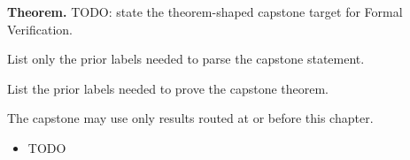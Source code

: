 \label{cap:formal-verification}

\begin{tcolorbox}[
  colback=gray!6,
  colframe=gray!40,
  arc=2pt,
  left=8pt, right=8pt, top=6pt, bottom=6pt,
  title={\small\textbf{Capstone Theorem}},
  fonttitle=\small\bfseries
]
\textbf{Theorem.}
TODO: state the theorem-shaped capstone target for Formal Verification.
\end{tcolorbox}

\begin{remark*}
List only the prior labels needed to parse the capstone statement.
\end{remark*}

\begin{remark*}
List the prior labels needed to prove the capstone theorem.
\end{remark*}

\begin{remark*}
The capstone may use only results routed at or before this chapter.
\end{remark*}

\begin{dependencies}
\begin{itemize}
  \item TODO
\end{itemize}
\end{dependencies}

\clearpage
